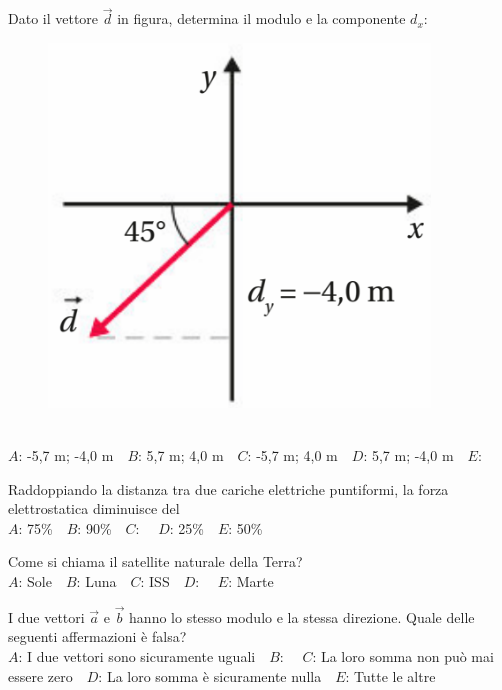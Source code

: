 \mcquestionheader Dato il vettore $\vec{d}$ in figura, determina il modulo e la componente $d_x$: \begin{figure}[h!]   \begin{center}     \includegraphics[scale=0.35]{vettored.png}   \end{center} \end{figure}\\
{$A$}: -5,7 m; -4,0 m\ \ {$B$}: 5,7 m; 4,0 m\ \ {$C$}: -5,7 m; 4,0 m\ \ {$D$}: 5,7 m; -4,0 m\ \ {$E$}: \ \ 

\mcquestionfooter



\def\mcquestionnumber{10}


\mcquestionheader Raddoppiando la distanza tra due cariche elettriche puntiformi, la forza elettrostatica diminuisce del\\
{$A$}: 75\%\ \ {$B$}: 90\%\ \ {$C$}: \ \ {$D$}: 25\%\ \ {$E$}: 50\%\ \ 

\mcquestionfooter



\def\mcquestionnumber{11}


\mcquestionheader Come si chiama il satellite naturale della Terra?\\
{$A$}: Sole\ \ {$B$}: Luna\ \ {$C$}: ISS\ \ {$D$}: \ \ {$E$}: Marte\ \ 

\mcquestionfooter



\def\mcquestionnumber{12}


\mcquestionheader I due vettori $\vec{a}$ e $\vec{b}$ hanno lo stesso modulo e la stessa direzione. Quale delle seguenti affermazioni è falsa?\\
{$A$}: I due vettori sono sicuramente uguali\ \ {$B$}: \ \ {$C$}: La loro somma non può mai essere zero\ \ {$D$}: La loro somma è sicuramente nulla\ \ {$E$}: Tutte le altre\ \ 

